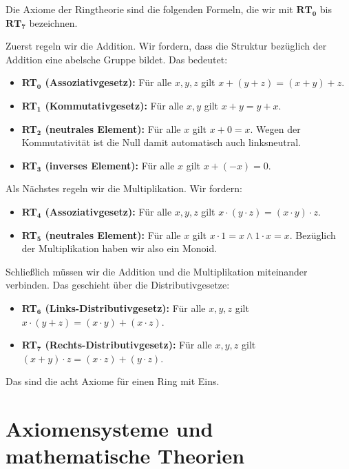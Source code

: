 \begin{spoken-clean}[01:03:42 - 01:05:57]
Die Axiome der Ringtheorie sind die folgenden Formeln, die wir mit $\mathbf{RT_0}$ bis $\mathbf{RT_7}$ bezeichnen. 

Zuerst regeln wir die Addition. Wir fordern, dass die Struktur bezüglich der Addition eine abelsche Gruppe bildet. Das bedeutet:
\begin{itemize}
    \item \textbf{RT$_{\mathbf{0}}$ (Assoziativgesetz):} Für alle $x, y, z$ gilt $x + (y + z) = (x + y) + z$.
    \item \textbf{RT$_{\mathbf{1}}$ (Kommutativgesetz):} Für alle $x, y$ gilt $x + y = y + x$.
    \item \textbf{RT$_{\mathbf{2}}$ (neutrales Element):} Für alle $x$ gilt $x + 0 = x$. Wegen der Kommutativität ist die Null damit automatisch auch linksneutral.
    \item \textbf{RT$_{\mathbf{3}}$ (inverses Element):} Für alle $x$ gilt $x + (-x) = 0$.
\end{itemize}

Als Nächstes regeln wir die Multiplikation. Wir fordern:
\begin{itemize}
    \item \textbf{RT$_{\mathbf{4}}$ (Assoziativgesetz):} Für alle $x, y, z$ gilt $x \cdot (y \cdot z) = (x \cdot y) \cdot z$.
    \item \textbf{RT$_{\mathbf{5}}$ (neutrales Element):} Für alle $x$ gilt $x \cdot 1 = x \wedge 1 \cdot x = x$. Bezüglich der Multiplikation haben wir also ein Monoid.
\end{itemize}

Schließlich müssen wir die Addition und die Multiplikation miteinander verbinden. Das geschieht über die Distributivgesetze:
\begin{itemize}
    \item \textbf{RT$_{\mathbf{6}}$ (Links-Distributivgesetz):} Für alle $x, y, z$ gilt $x \cdot (y + z) = (x \cdot y) + (x \cdot z)$.
    \item \textbf{RT$_{\mathbf{7}}$ (Rechts-Distributivgesetz):} Für alle $x, y, z$ gilt $(x + y) \cdot z = (x \cdot z) + (y \cdot z)$.
\end{itemize}

Das sind die acht Axiome für einen Ring mit Eins.
\end{spoken-clean}

\section{Axiomensysteme und mathematische Theorien}
